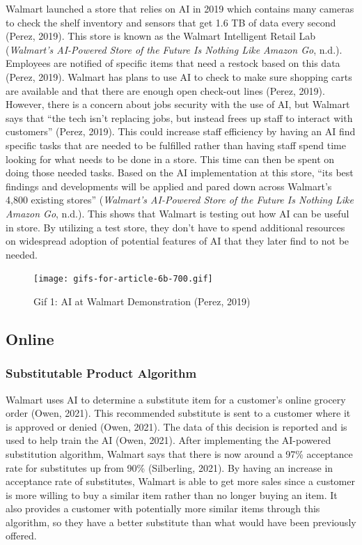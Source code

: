 \documentclass[
]{article}
\begin{document}
Walmart launched a store that relies on AI in 2019 which contains many cameras to check the shelf inventory and sensors that get 1.6 TB of data every second (Perez, 2019). This store is known as the Walmart Intelligent Retail Lab (\emph{Walmart's AI-Powered Store of the Future Is Nothing Like Amazon Go}, n.d.). Employees are notified of specific items that need a restock based on this data (Perez, 2019). Walmart has plans to use AI to check to make sure shopping carts are available and that there are enough open check-out lines (Perez, 2019). However, there is a concern about jobs security with the use of AI, but Walmart says that ``the tech isn't replacing jobs, but instead frees up staff to interact with customers'' (Perez, 2019). This could increase staff efficiency by having an AI find specific tasks that are needed to be fulfilled rather than having staff spend time looking for what needs to be done in a store. This time can then be spent on doing those needed tasks. Based on the AI implementation at this store, ``its best findings and developments will be applied and pared down across Walmart's 4,800 existing stores'' (\emph{Walmart's AI-Powered Store of the Future Is Nothing Like Amazon Go}, n.d.). This shows that Walmart is testing out how AI can be useful in store. By utilizing a test store, they don't have to spend additional resources on widespread adoption of potential features of AI that they later find to not be needed.

\begin{figure}
\centering
\texttt{[image: gifs-for-article-6b-700.gif]}
\caption{Gif 1: AI at Walmart Demonstration (Perez, 2019)}
\end{figure}

\hypertarget{online}{%
\subsection{Online}\label{online}}

\hypertarget{substitutable-product-algorithm}{%
\subsubsection{Substitutable Product Algorithm}\label{substitutable-product-algorithm}}

Walmart uses AI to determine a substitute item for a customer's online grocery order (Owen, 2021). This recommended substitute is sent to a customer where it is approved or denied (Owen, 2021). The data of this decision is reported and is used to help train the AI (Owen, 2021). After implementing the AI-powered substitution algorithm, Walmart says that there is now around a 97\% acceptance rate for substitutes up from 90\% (Silberling, 2021). By having an increase in acceptance rate of substitutes, Walmart is able to get more sales since a customer is more willing to buy a similar item rather than no longer buying an item. It also provides a customer with potentially more similar items through this algorithm, so they have a better substitute than what would have been previously offered.
\end{document}
